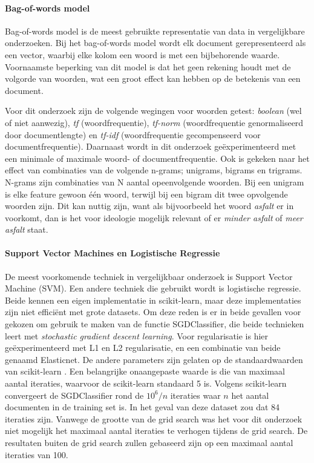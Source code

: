\paragraph{Bag-of-words model}
Bag-of-words model is de meest gebruikte representatie van data in vergelijkbare onderzoeken. Bij het bag-of-words model wordt elk document gerepresenteerd als een vector, waarbij elke kolom een woord is met een bijbehorende waarde. Voornaamste beperking van dit model is dat het geen rekening houdt met de volgorde van woorden, wat een groot effect kan hebben op de betekenis van een document.\par
Voor dit onderzoek zijn de volgende wegingen voor woorden getest: \textit{boolean} (wel of niet aanwezig), \textit{tf} (woordfrequentie), \textit{tf-norm} (woordfrequentie genormaliseerd door documentlengte) en \textit{tf-idf} (woordfrequentie gecompenseerd voor documentfrequentie). Daarnaast wordt in dit onderzoek geëxperimenteerd met een minimale of maximale woord- of documentfrequentie. Ook is gekeken naar het effect van combinaties van de volgende n-grams; unigrams, bigrams en trigrams. N-grams zijn combinaties van N aantal opeenvolgende woorden. Bij een unigram is elke feature gewoon één woord, terwijl bij een bigram dit twee opvolgende woorden zijn. Dit kan nuttig zijn, want als bijvoorbeeld het woord \textit{asfalt} er in voorkomt, dan is het voor ideologie mogelijk relevant of er \textit{minder asfalt} of \textit{meer asfalt} staat.\par

\paragraph{Support Vector Machines en Logistische Regressie}
De meest voorkomende techniek in vergelijkbaar onderzoek is Support Vector Machine (SVM). Een andere techniek die gebruikt wordt is logistische regressie. Beide kennen een eigen implementatie in scikit-learn, maar deze implementaties zijn niet efficiënt met grote datasets. Om deze reden is er in beide gevallen voor gekozen om gebruik te maken van de functie SGDClassifier, die beide technieken leert met \textit{stochastic gradient descent learning}. Voor regularisatie is hier geëxperimenteerd met L1 en L2 regularisatie, en een combinatie van beide genaamd Elasticnet. De andere parameters zijn gelaten op de standaardwaarden van scikit-learn \cite{scikit-learn}. Een belangrijke onaangepaste waarde is die van maximaal aantal iteraties, waarvoor de scikit-learn standaard 5 is. Volgens scikit-learn convergeert de SGDClassifier rond de $10^{6}/n$ iteraties waar $n$ het aantal documenten in de training set is. In het geval van deze dataset zou dat 84 iteraties zijn. Vanwege de grootte van de grid search was het voor dit onderzoek niet mogelijk het maximaal aantal iteraties te verhogen tijdens de grid search. De resultaten buiten de grid search zullen gebaseerd zijn op een maximaal aantal iteraties van 100.\par

